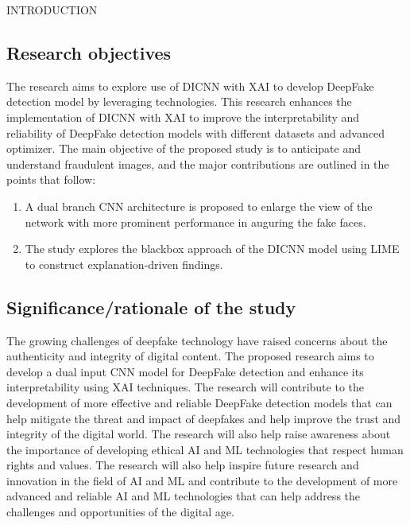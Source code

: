 \begin{section}[]{\uppercase{Introduction}}
    \subsection{Research objectives}
    The research aims to explore use of DICNN with XAI to develop DeepFake detection model by leveraging technologies. This research enhances the implementation of DICNN with XAI to improve the interpretability and reliability of DeepFake detection models with different datasets and advanced optimizer.
    The main objective of the proposed study is to anticipate and understand fraudulent images, and the major contributions are outlined in the points that follow:
    \begin{enumerate}[label=\bf{O\arabic*}]
        \item A dual branch CNN architecture is proposed to enlarge the view of the network with more prominent performance in auguring the fake faces.
        \item The study explores the blackbox approach of the DICNN model using LIME to construct explanation-driven findings.
    \end{enumerate}

    
    \subsection{Significance/rationale of the study}
    The growing challenges of deepfake technology have raised concerns about the authenticity and integrity of digital content. 
    The proposed research aims to develop a dual input CNN model for DeepFake detection and enhance its interpretability using XAI techniques. 
    The research will contribute to the development of more effective and reliable DeepFake detection models that can help mitigate the threat and impact of deepfakes and help improve the trust and integrity of the digital world. 
    The research will also help raise awareness about the importance of developing ethical AI and ML technologies that respect human rights and values. 
    The research will also help inspire future research and innovation in the field of AI and ML and contribute to the development of more advanced and reliable AI and ML technologies that can help address the challenges and opportunities of the digital age.


\end{section}
